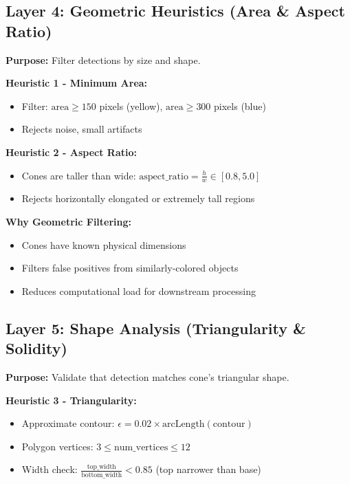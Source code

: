 \documentclass[11pt]{article}
\begin{document}
\subsection{Layer 4: Geometric Heuristics (Area \& Aspect Ratio)}

\textbf{Purpose:} Filter detections by size and shape.

\textbf{Heuristic 1 - Minimum Area:}
\begin{itemize}
    \item Filter: $\text{area} \geq 150$ pixels (yellow), $\text{area} \geq 300$ pixels (blue)
    \item Rejects noise, small artifacts
\end{itemize}

\textbf{Heuristic 2 - Aspect Ratio:}
\begin{itemize}
    \item Cones are taller than wide: $\text{aspect\_ratio} = \frac{h}{w} \in [0.8, 5.0]$
    \item Rejects horizontally elongated or extremely tall regions
\end{itemize}

\textbf{Why Geometric Filtering:}
\begin{itemize}
    \item Cones have known physical dimensions
    \item Filters false positives from similarly-colored objects
    \item Reduces computational load for downstream processing
\end{itemize}

\subsection{Layer 5: Shape Analysis (Triangularity \& Solidity)}

\textbf{Purpose:} Validate that detection matches cone's triangular shape.

\textbf{Heuristic 3 - Triangularity:}
\begin{itemize}
    \item Approximate contour: $\epsilon = 0.02 \times \text{arcLength}(\text{contour})$
    \item Polygon vertices: $3 \leq \text{num\_vertices} \leq 12$
    \item Width check: $\frac{\text{top\_width}}{\text{bottom\_width}} < 0.85$ (top narrower than base)
\end{itemize}
\end{document}
